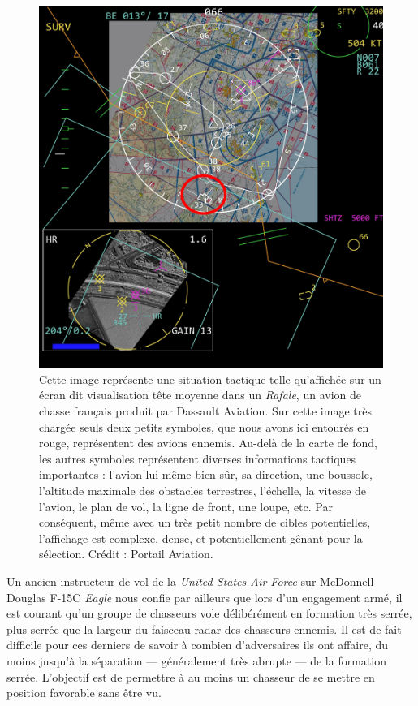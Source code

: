 	\begin{figure}[htb]
		\centering
		\includegraphics[width=\textwidth]{figures/ch1/sitac}
		\caption[Situation tactique vue d'un \emph{Rafale}.]{Cette image représente une situation tactique telle qu'affichée sur un écran dit \og visualisation tête moyenne \fg{} dans un \emph{Rafale}, un avion de chasse français produit par Dassault Aviation. Sur cette image très \og chargée \fg{} seuls deux petits symboles, que nous avons ici entourés en rouge, représentent des avions ennemis. Au-delà de la carte de fond, les autres symboles représentent diverses informations tactiques importantes : l'avion lui-même bien sûr, sa direction, une boussole, l'altitude maximale des obstacles terrestres, l'échelle, la vitesse de l'avion, le plan de vol, la ligne de front, une loupe, etc. Par conséquent, même avec un très petit nombre de cibles potentielles, l'affichage est complexe, dense, et potentiellement gênant pour la sélection. Crédit : Portail Aviation\footnotemark.}
		\label{fig:sitac}
	\end{figure}
	
	
	Un ancien instructeur de vol de la \emph{United States Air Force}\footnotemark{} sur McDonnell Douglas F-15C \emph{Eagle} nous confie par ailleurs que lors d'un engagement armé, il est courant qu'un groupe de chasseurs vole délibérément en formation très serrée, plus serrée que la largeur du faisceau radar des chasseurs ennemis. Il est de fait difficile pour ces derniers de savoir à combien d'adversaires ils ont affaire, du moins jusqu'à la séparation --- généralement très abrupte --- de la formation serrée. L'objectif est de permettre à au moins un chasseur de se mettre en position favorable sans être vu.
	
